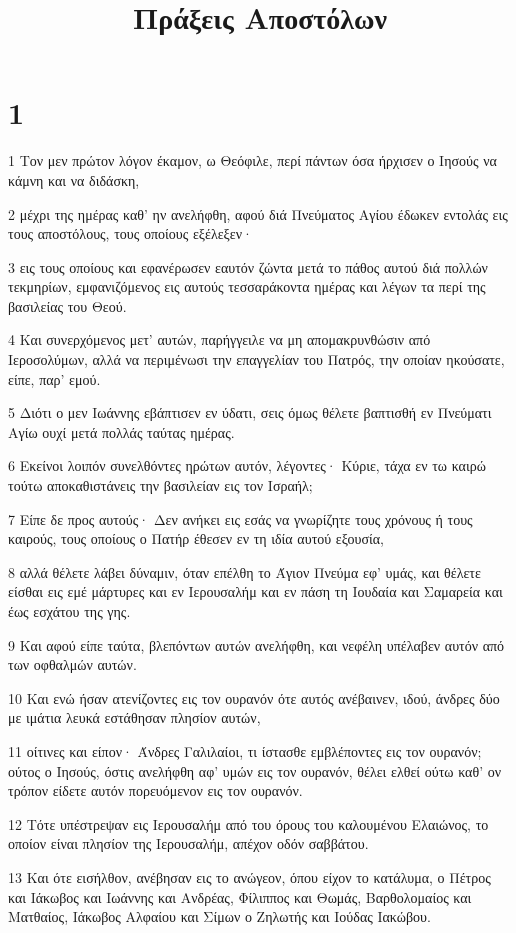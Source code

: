 

\title{Πράξεις Αποστόλων}


\chapter{1}

\par 1 Τον μεν πρώτον λόγον έκαμον, ω Θεόφιλε, περί πάντων όσα ήρχισεν ο Ιησούς να κάμνη και να διδάσκη,
\par 2 μέχρι της ημέρας καθ' ην ανελήφθη, αφού διά Πνεύματος Αγίου έδωκεν εντολάς εις τους αποστόλους, τους οποίους εξέλεξεν·
\par 3 εις τους οποίους και εφανέρωσεν εαυτόν ζώντα μετά το πάθος αυτού διά πολλών τεκμηρίων, εμφανιζόμενος εις αυτούς τεσσαράκοντα ημέρας και λέγων τα περί της βασιλείας του Θεού.
\par 4 Και συνερχόμενος μετ' αυτών, παρήγγειλε να μη απομακρυνθώσιν από Ιεροσολύμων, αλλά να περιμένωσι την επαγγελίαν του Πατρός, την οποίαν ηκούσατε, είπε, παρ' εμού.
\par 5 Διότι ο μεν Ιωάννης εβάπτισεν εν ύδατι, σεις όμως θέλετε βαπτισθή εν Πνεύματι Αγίω ουχί μετά πολλάς ταύτας ημέρας.
\par 6 Εκείνοι λοιπόν συνελθόντες ηρώτων αυτόν, λέγοντες· Κύριε, τάχα εν τω καιρώ τούτω αποκαθιστάνεις την βασιλείαν εις τον Ισραήλ;
\par 7 Είπε δε προς αυτούς· Δεν ανήκει εις εσάς να γνωρίζητε τους χρόνους ή τους καιρούς, τους οποίους ο Πατήρ έθεσεν εν τη ιδία αυτού εξουσία,
\par 8 αλλά θέλετε λάβει δύναμιν, όταν επέλθη το Άγιον Πνεύμα εφ' υμάς, και θέλετε είσθαι εις εμέ μάρτυρες και εν Ιερουσαλήμ και εν πάση τη Ιουδαία και Σαμαρεία και έως εσχάτου της γης.
\par 9 Και αφού είπε ταύτα, βλεπόντων αυτών ανελήφθη, και νεφέλη υπέλαβεν αυτόν από των οφθαλμών αυτών.
\par 10 Και ενώ ήσαν ατενίζοντες εις τον ουρανόν ότε αυτός ανέβαινεν, ιδού, άνδρες δύο με ιμάτια λευκά εστάθησαν πλησίον αυτών,
\par 11 οίτινες και είπον· Άνδρες Γαλιλαίοι, τι ίστασθε εμβλέποντες εις τον ουρανόν; ούτος ο Ιησούς, όστις ανελήφθη αφ' υμών εις τον ουρανόν, θέλει ελθεί ούτω καθ' ον τρόπον είδετε αυτόν πορευόμενον εις τον ουρανόν.
\par 12 Τότε υπέστρεψαν εις Ιερουσαλήμ από του όρους του καλουμένου Ελαιώνος, το οποίον είναι πλησίον της Ιερουσαλήμ, απέχον οδόν σαββάτου.
\par 13 Και ότε εισήλθον, ανέβησαν εις το ανώγεον, όπου είχον το κατάλυμα, ο Πέτρος και Ιάκωβος και Ιωάννης και Ανδρέας, Φίλιππος και Θωμάς, Βαρθολομαίος και Ματθαίος, Ιάκωβος Αλφαίου και Σίμων ο Ζηλωτής και Ιούδας Ιακώβου.
